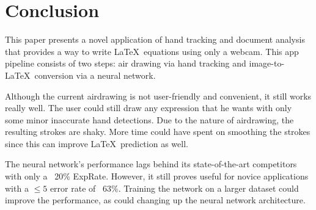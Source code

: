 \section{Conclusion}
\label{sec:conclusion}

This paper presents a novel application of hand tracking and document analysis that provides a way to write \LaTeX\ equations using only a webcam. This app pipeline consists of two steps: air drawing via hand tracking and image-to-\LaTeX\ conversion via a neural network. 

Although the current airdrawing is not user-friendly and convenient, it still works really well. The user could still draw any expression that he wants with only some minor inaccurate hand detections. Due to the nature of airdrawing, the resulting strokes are shaky. More time could have spent on smoothing the strokes since this can improve \LaTeX\ prediction as well. 

The neural network's performance lags behind its state-of-the-art competitors with only a ~20\% ExpRate. However, it still proves useful for novice applications with a $\leq5$ error rate of ~63\%. Training the network on a larger dataset could improve the performance, as could changing up the neural network architecture. 




